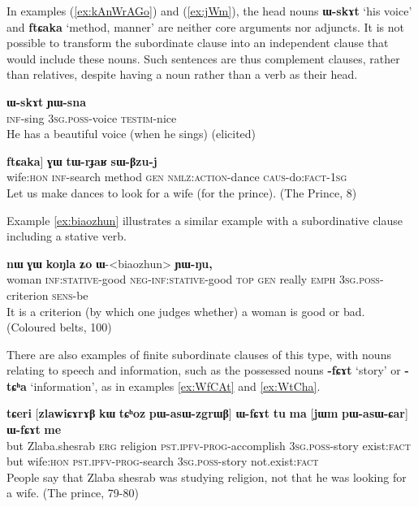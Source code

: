 \documentclass[oneside,a4paper,11pt]{article}
\newcommand{\ipa}[1]{\textbf{\phon#1}} %
\newcommand{\jpg}[2]{\ipa{#1} `#2'} %
\newcommand{\refb}[1]{(\ref{#1})}
\begin{document}
 In examples \refb{ex:kAnWrAGo} and \refb{ex:jWm}, the head nouns \jpg{ɯ-skɤt}{his voice} and \jpg{ftɕaka}{method, manner} are neither core arguments nor adjuncts. It is not possible to transform the subordinate clause into an independent clause that would include these nouns. Such sentences are thus complement clauses, rather than relatives, despite having a noun rather than a verb as their head.

\begin{exe}
   \ex  \label{ex:kAnWrAGo}
\gll   
[\ipa{kɤ-nɯrɤɣo}]  \textbf{\ipa{ɯ-skɤt}} 	\ipa{ɲɯ-sna}  \\
\textsc{inf}-sing \textsc{3sg.poss}-voice \textsc{testim}-nice \\
\glt He has a beautiful voice (when he sings) (elicited)
   \end{exe}
   
   \begin{exe}
   \ex  \label{ex:jWm}
\gll
[[\ipa{jɯm}  	\ipa{kɤ-ɕar}]  	  \textbf{\ipa{ftɕaka}}]   \ipa{ɣɯ}	 	\ipa{tɯ-rɟaʁ}    	\ipa{sɯ-βzu-j}  \\
wife:\textsc{hon} \textsc{inf}-search   method   \textsc{gen} \textsc{nmlz:action}-dance \textsc{caus}-do:\textsc{fact}-\textsc{1sg} \\ 
\glt Let us make dances to look for a wife (for the prince). (The Prince, 8)
   \end{exe}

 Example \ref{ex:biaozhun} illustrates a similar example with a subordinative clause including a stative verb.
 
\begin{exe}
   \ex  \label{ex:biaozhun}
\gll   
 	[\ipa{tɕʰeme}  	\ipa{kɯ-pe}  	\ipa{mɤ-kɯ-pe}]  	\ipa{nɯ}  	\ipa{ɣɯ}  	\ipa{koŋla}  	\ipa{ʑo}  	\ipa{ɯ}-<biaozhun>  	\ipa{ɲɯ-ŋu,}  \\
woman \textsc{inf:stative}-good \textsc{neg-inf:stative}-good \textsc{top} \textsc{gen} really \textsc{emph} \textsc{3sg.poss}-criterion \textsc{sens}-be \\
\glt It is a criterion (by which one judges whether) a woman is good or bad. (Coloured belts, 100)
   \end{exe}

There are also examples of finite subordinate clauses of this type, with nouns relating to  speech and information, such as the possessed nouns \ipa{-fɕɤt} `story' or \ipa{-tɕʰa} `information', as in examples  \ref{ex:WfCAt} and \ref{ex:WtCha}.

\begin{exe}
   \ex  \label{ex:WfCAt}
\gll   \ipa{tɕeri}  	[\ipa{zlawiɕɤrɤβ}  	\ipa{kɯ}  	\ipa{tɕʰoz}  	\ipa{pɯ-asɯ-zgrɯβ}]  	\ipa{ɯ-fɕɤt}  	\ipa{tu}  	\ipa{ma}  	[\ipa{jɯm}  	\ipa{pɯ-asɯ-ɕar}]  	\ipa{ɯ-fɕɤt}  	\ipa{me}  \\
but Zlaba.shesrab \textsc{erg} religion \textsc{pst.ipfv-prog}-accomplish \textsc{3sg.poss}-story
exist:\textsc{fact} but wife:\textsc{hon} \textsc{pst.ipfv-prog}-search \textsc{3sg.poss}-story not.exist:\textsc{fact} \\
\glt People say that Zlaba shesrab was studying religion, not that he was looking for a wife.  (The prince, 79-80)
\end{exe}
\end{document}
